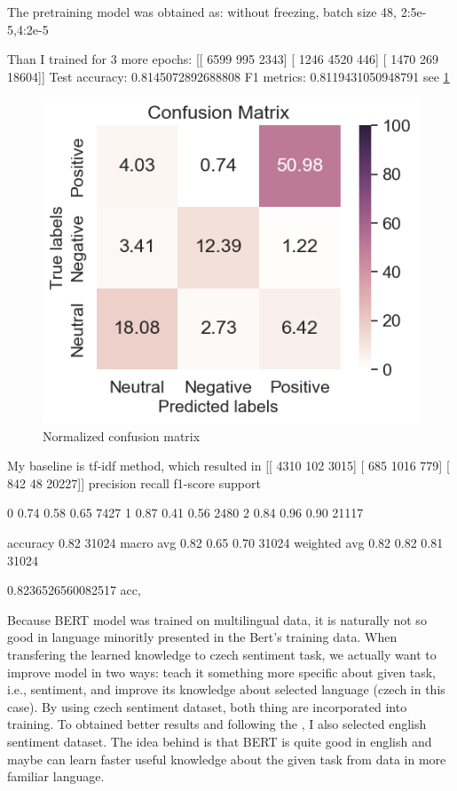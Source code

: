 The pretraining model was obtained as:
without freezing, batch size 48, 2:5e-5,4:2e-5



Than I trained for 3 more epochs:
[[ 6599 995 2343]
[ 1246 4520 446]
[ 1470 269 18604]]
Test accuracy: 0.8145072892688808
F1 metrics: 0.8119431050948791
see \ref{pic:conf1}
\begin{figure}[h]
\centering
\includegraphics[width=1\columnwidth]{../img/confusion_matrix}
\protect\caption{Normalized confusion matrix}
\label{pic:conf1}
\end{figure}


My baseline is tf-idf method, which resulted in 
[[ 4310   102  3015]
 [  685  1016   779]
 [  842    48 20227]]
              precision    recall  f1-score   support

           0       0.74      0.58      0.65      7427
           1       0.87      0.41      0.56      2480
           2       0.84      0.96      0.90     21117

    accuracy                           0.82     31024
   macro avg       0.82      0.65      0.70     31024
weighted avg       0.82      0.82      0.81     31024

0.8236526560082517 acc,


Because BERT model was trained on multilingual data, it is naturally not so good in language minoritly presented in the Bert's training data. When transfering the learned knowledge to czech sentiment task, we actually want to improve model in two ways: teach it something more specific about given task, i.e., sentiment, and improve its knowledge about selected language (czech in this case). By using czech sentiment dataset, both thing are incorporated into training. To obtained better results and following the \citep{Putra}, I also selected english sentiment dataset. The idea behind is that BERT is quite good in english and maybe can learn faster useful knowledge about the given task from data in more familiar language.














